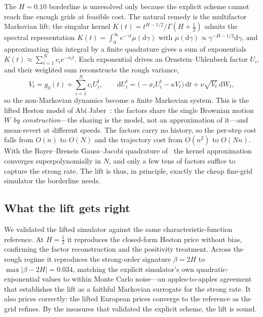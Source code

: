 \documentclass{siamonline250211}
\begin{document}
The $H=0.10$ borderline is unresolved only because the explicit scheme cannot reach fine
enough grids at feasible cost. The natural remedy is the multifactor Markovian lift: the
singular kernel $K(t)=t^{H-1/2}/\Gamma(H+\tfrac12)$ admits the spectral representation
$K(t)=\int_0^\infty e^{-\gamma t}\mu(\mathrm{d}\gamma)$ with
$\mu(\mathrm{d}\gamma)\propto \gamma^{-H-1/2}\mathrm{d}\gamma$, and approximating this
integral by a finite quadrature gives a sum of exponentials
$K(t)\approx\sum_{i=1}^N c_i e^{-x_i t}$. Each exponential drives an Ornstein--Uhlenbeck
factor $U_i$, and their weighted sum reconstructs the rough variance,
\begin{equation}
V_t = g_0(t) + \sum_{i=1}^N c_i U_i^t,
\qquad
\mathrm{d}U_i^t = \big(-x_i U_i^t - \kappa V_t\big)\,\mathrm{d}t
                 + \nu\sqrt{V_t}\,\mathrm{d}W_t,
\end{equation}
so the non-Markovian dynamics become a finite Markovian system. This is the lifted
Heston model of Abi Jaber~\cite{aj2019}: the factors share the single Brownian motion
$W$ \emph{by construction}---the sharing is the model, not an approximation of it---and
mean-revert at different speeds. The factors carry no
history, so the per-step cost falls from $O(n)$ to $O(N)$ and the trajectory cost from
$O(n^2)$ to $O(Nn)$. With the Bayer--Breneis Gauss--Jacobi quadrature of~\cite{bbf2023} the kernel approximation
converges superpolynomially in $N$, and only a few tens of factors suffice to capture the
strong rate. The lift is thus, in principle, exactly the cheap fine-grid simulator the
borderline needs.

\subsection{What the lift gets right}

We validated the lifted simulator against the same characteristic-function reference. At
$H=\tfrac12$ it reproduces the closed-form Heston price without bias, confirming the factor
reconstruction and the positivity treatment. Across the rough regime it reproduces the
strong-order signature $\beta=2H$ to $\max|\beta-2H|=0.034$, matching the explicit
simulator's own quadratic-exponential values to within Monte Carlo noise---an
apples-to-apples agreement that establishes the lift as a faithful Markovian surrogate for
the strong rate. It also prices correctly: the lifted European prices converge to the
reference as the grid refines. By the measures that validated the explicit scheme, the lift
is sound.
\end{document}
